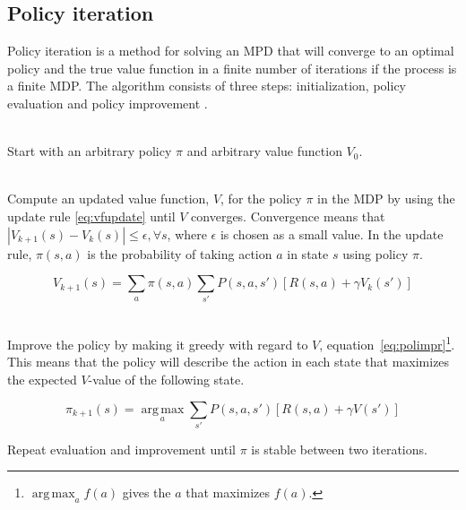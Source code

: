 \subsection{Policy iteration}
\label{sec:pol_itr}

Policy iteration is a method for solving an MPD that will converge to an
optimal policy and the true value function in a finite number of iterations if
the process is a finite MDP. The algorithm consists of three steps:
initialization, policy evaluation and policy improvement
\parencite{barto1998reinforcement}.

\begin{description}
\item[Initialization] \hfill \\
    Start with an arbitrary policy $\pi$ and arbitrary value function $V_0$.

\item[Policy evaluation] \hfill \\
  Compute an updated value function, $V$, for the policy $\pi$ in the MDP by using
  the update rule \eqref{eq:vfupdate} until $V$ converges. Convergence means that $|V_{k+1}(s) - V_{k}(s)| \leq \epsilon, \forall s$, where $\epsilon$ is chosen as a small value.  In the update rule, $\pi(s, a)$ is the
  probability of taking action $a$ in state $s$ using policy $\pi$.

\begin{equation} \label{eq:vfupdate}
  V_{k+1} (s) = \sum_a \pi(s, a) \sum_{s'} P(s, a, s') \left[ R(s, a) + \gamma V_k(s')  \right]
\end{equation}

\item[Policy improvement] \hfill \\
  Improve the policy by making it greedy with regard to $V$,
  equation~\eqref{eq:polimpr}\footnote{$\operatorname*{arg\,max} _a f(a)$ gives
  the $a$ that maximizes $f(a)$.}. This means that the policy will describe the
  action in each state that maximizes the expected $V$-value of the following
  state. 

\begin{equation} \label{eq:polimpr}
  \pi_{k+1} (s) = \operatorname*{arg\,max}_a \sum_{s'}P(s, a, s') \left[ R(s, a) + \gamma V(s') \right]
\end{equation}

\item Repeat evaluation and improvement until $\pi$ is stable between two iterations.
\end{description}


